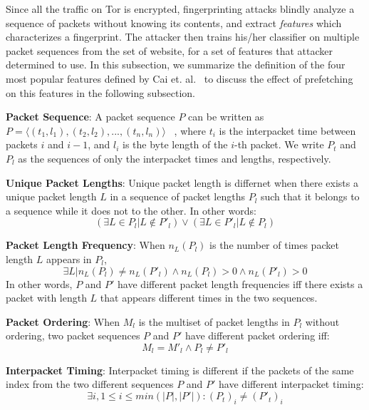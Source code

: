 Since all the traffic on Tor is encrypted, fingerprinting attacks blindly analyze a sequence of packets without knowing its contents, and extract {\it features} which characterizes a fingerprint.
The attacker then trains his/her classifier on multiple packet sequences from the set of website, for a set of features that attacker determined to use.
In this subsection, we summarize the definition of the four most popular features defined by Cai et. al.~\cite{Cai:2014kjb} to discuss the effect of prefetching on this features in the following subsection.

{\bf Packet Sequence}:
A packet sequence $P$ can be written as $P = \langle(t_1, l_1), (t_2, l_2), ..., (t_n, l_n)\rangle$ ~\cite{Cai:2014kjb}, where $t_i$ is the interpacket time between packets $i$ and $i-1$, and $l_i$ is the byte length of the $i$-th packet.
We write $P_t$ and $P_l$ as the sequences of only the interpacket times and lengths, respectively.

{\bf Unique Packet Lengths}: 
Unique packet length is differnet when there exists a unique packet length $L$ in a sequence of packet lengths $P_l$ such that it belongs to a sequence while it does not to the other. In other words:
\begin{equation}
(\exists L \in P_l | L \notin P'_l ) \vee (\exists L \in P'_l | L \notin P_l)
\end{equation}

{\bf Packet Length Frequency}:
When $n_L(P_l)$ is the number of times packet length $L$ appears in $P_l$,
\begin{equation}
\exists L|n_L(P_l) \neq n_L(P'_l) \wedge n_L(P_l)>0 \wedge n_L(P'_l) >0
\end{equation}
In other words, $P$ and $P'$ have different packet length frequencies iff there exists a packet with length $L$ that appears different times in the two sequences.

{\bf Packet Ordering}:
When $M_l$ is the multiset of packet lengths in $P_l$ without ordering, two packet sequences $P$ and $P'$ have different packet ordering iff:
\begin{equation}
M_{ l }=M'_{ l }\wedge P_{ l }\neq P'_{ l }
\end{equation}

{\bf Interpacket Timing}:
Interpacket timing is different if the packets of the same index from the two different sequences $P$ and $P'$ have different interpacket timing:
\begin{equation}
\exists i, 1 \le i \le \mathit{min}(|P|, |P'|) : (P_t)_i \neq (P'_t)_i
\end{equation}


